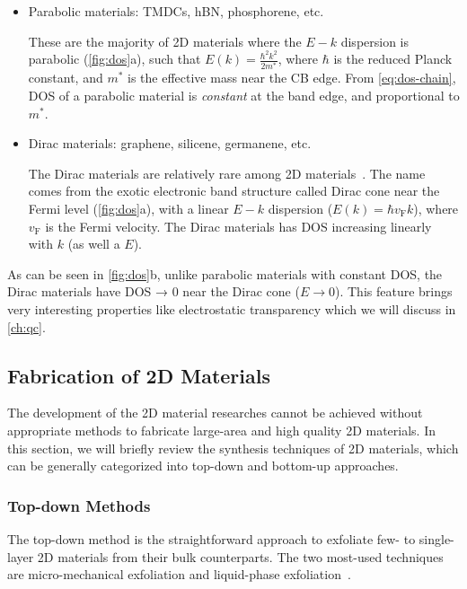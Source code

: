 \begin{itemize}
\item Parabolic materials: TMDCs, hBN, phosphorene, etc.

  These are the majority of 2D materials where the $E-k$ dispersion is
  parabolic (\autoref{fig:dos}a), such that
  ${\displaystyle E(k) = \frac{\hbar^{2} k^{2}}{2 m^{*}}}$, where
  $\hbar$ is the reduced Planck constant, and $m^{*}$ is the effective
  mass near the CB edge. From \autoref{eq:dos-chain}, DOS of a
  parabolic material is \textit{constant} at the band edge, and
  proportional to $m^{*}$.
  
\item Dirac materials: graphene, silicene, germanene, etc.

  The Dirac materials are relatively rare among 2D
  materials~\cite{Wang_2015_rare_dirac}.
  The name comes from the exotic electronic band structure called
  Dirac cone near the Fermi level (\autoref{fig:dos}a), with a linear
  $E-k$ dispersion ($E(k) = \hbar v_{\mathrm{F}}k$), where
  $v_{\mathrm{F}}$ is the Fermi velocity. The Dirac materials has DOS
  increasing linearly with $k$ (as well a $E$).
\end{itemize}

As can be seen in \autoref{fig:dos}b, unlike parabolic
materials with constant DOS, the Dirac materials have DOS → 0 near the
Dirac cone ($E \to 0$). This feature brings very interesting
properties like electrostatic transparency which we will discuss in
\autoref{ch:qc}.


\subsection{Fabrication of 2D Materials}
\label{sec:fabr-2d-mater}

The development of the 2D material researches cannot be achieved
without appropriate methods to fabricate large-area and high quality
2D materials. In this section, we will briefly review the synthesis
techniques of 2D materials, which can be generally categorized into
top-down and bottom-up approaches. 

\subsubsection{Top-down Methods}
\label{sec:top-down-methods}

The top-down method is the straightforward approach to exfoliate few-
to single-layer 2D materials from their bulk counterparts. The two
most-used techniques are micro-mechanical exfoliation and liquid-phase
exfoliation~\cite{Novoselov_2012_roadmap,Liu_2018_rev,Lin_2019_gr_rev_growth}.


